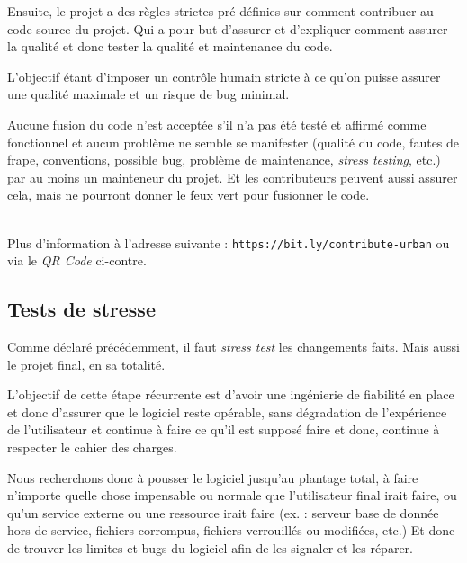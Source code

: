 \documentclass[final]{article}
\begin{document}
      \indent Ensuite, le projet a des règles strictes pré-définies 
      sur comment contribuer au code source du projet. Qui a pour but
      d'assurer et d'expliquer comment assurer la qualité 
      et donc tester la qualité et maintenance du code.
        
      \indent L'objectif étant d'imposer un contrôle humain
      stricte à ce qu'on puisse assurer une qualité maximale
      et un risque de bug minimal.
        
      \begin{vwcol}[widths={0.85,0.15}, sep=.2cm, justify=flush,rule=0pt,indent=1em]
        \indent Aucune fusion du code n'est acceptée s'il n'a pas été
        testé et affirmé comme fonctionnel et 
        aucun problème ne semble se manifester 
        (qualité du code, fautes de frape, conventions, possible bug, 
        problème de maintenance, \emph{stress testing}, etc.)
        par au moins un mainteneur du projet. 
        Et les contributeurs peuvent aussi assurer cela, 
        mais ne pourront donner le feux vert pour fusionner le code.
        
        ~\\\indent Plus d'information à l'adresse suivante :
        \texttt{https://bit.ly/contribute-urban} 
        ou via le \emph{QR Code} ci-contre.     
          
        \vfill\eject
      \end{vwcol}
    
    \subsection{Tests de stresse}
      Comme déclaré précédemment, il faut \emph{stress test} 
      les changements faits. Mais aussi le projet final, en sa totalité.
      
      L'objectif de cette étape récurrente est d'avoir une ingénierie de fiabilité 
      en place et donc d'assurer que le logiciel reste opérable, 
      sans dégradation de l'expérience de l'utilisateur et continue à faire
      ce qu'il est supposé faire et donc, continue à respecter le cahier des charges.
      
      Nous recherchons donc à pousser le logiciel jusqu'au plantage total,
      à faire n'importe quelle chose impensable ou normale que l'utilisateur final
      irait faire, ou qu'un service externe ou une ressource irait faire 
      (ex. : serveur base de donnée hors de service, fichiers corrompus, 
      fichiers verrouillés ou modifiées, etc.) 
      Et donc de trouver les limites et bugs du logiciel 
      afin de les signaler et les réparer.
      
\end{document}
